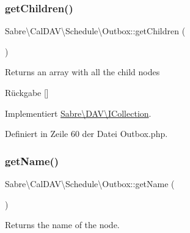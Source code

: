 \mbox{\label{class_sabre_1_1_cal_d_a_v_1_1_schedule_1_1_outbox_a08366beb598d4e73e772562cd342cba9}} 
\subsubsection{\texorpdfstring{get\+Children()}{getChildren()}}
{\footnotesize\ttfamily Sabre\textbackslash{}\+Cal\+D\+A\+V\textbackslash{}\+Schedule\textbackslash{}\+Outbox\+::get\+Children (\begin{DoxyParamCaption}{ }\end{DoxyParamCaption})}

Returns an array with all the child nodes

\begin{DoxyReturn}{Rückgabe}
\mbox{[}\mbox{]} 
\end{DoxyReturn}


Implementiert \mbox{\hyperlink{interface_sabre_1_1_d_a_v_1_1_i_collection_a5344a6890e49fd7a81bb0e38b4c6d0be}{Sabre\textbackslash{}\+D\+A\+V\textbackslash{}\+I\+Collection}}.



Definiert in Zeile 60 der Datei Outbox.\+php.

\mbox{\label{class_sabre_1_1_cal_d_a_v_1_1_schedule_1_1_outbox_a34b0979bc0b38533f891556fce8ee89d}} 
\subsubsection{\texorpdfstring{get\+Name()}{getName()}}
{\footnotesize\ttfamily Sabre\textbackslash{}\+Cal\+D\+A\+V\textbackslash{}\+Schedule\textbackslash{}\+Outbox\+::get\+Name (\begin{DoxyParamCaption}{ }\end{DoxyParamCaption})}

Returns the name of the node.

